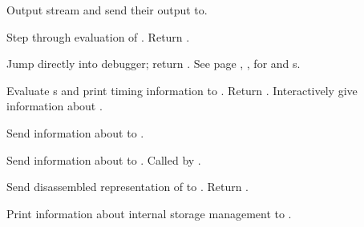\begin{LIST}{1cm}
  {
    Output stream  and  send their output to.
  }

  {
  Step through evaluation of . Return . 
  }

  {
  Jump directly into debugger; return \retval{\NIL}.
  See page \pageref{section:Format}, , for 
  and s. 
  }

  {
  Evaluate s and print timing information to
  . Return . 
  }
  {
    Interactively give information about .
  }

  {
  Send information about  to .
  }

  {
    Send information about  to .  Called by
    .
  }

  {
  Send disassembled representation of  to
  . Return \retval{\NIL}.
  }

  {
    Print information about internal storage management to .
  }



\end{LIST}


